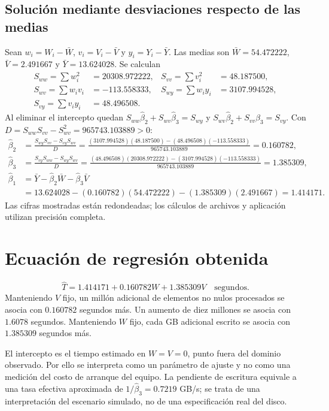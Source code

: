 \documentclass[11pt,a4paper]{article}
\begin{document}
\subsection{Solución mediante desviaciones respecto de las medias}
Sean $w_i=W_i-\bar W$, $v_i=V_i-\bar V$ y $y_i=Y_i-\bar Y$. Las medias son $\bar W=54.472222$, $\bar V=2.491667$ y $\bar Y=13.624028$. Se calculan
\begin{align*}
S_{ww}=\sum w_i^2&=20308.972222,& S_{vv}=\sum v_i^2&=48.187500,\\
S_{wv}=\sum w_iv_i&=-113.558333,& S_{wy}=\sum w_iy_i&=3107.994528,\\
S_{vy}=\sum v_iy_i&=48.496508.
\end{align*}
Al eliminar el intercepto quedan $S_{ww}\hat\beta_2+S_{wv}\hat\beta_3=S_{wy}$ y $S_{wv}\hat\beta_2+S_{vv}\hat\beta_3=S_{vy}$. Con $D=S_{ww}S_{vv}-S_{wv}^2=965743.103889>0$:
\begin{align*}
\hat\beta_2&=\frac{S_{wy}S_{vv}-S_{vy}S_{wv}}{D}
=\frac{(3107.994528)(48.187500)-(48.496508)(-113.558333)}{965743.103889}=0.160782,\\
\hat\beta_3&=\frac{S_{vy}S_{ww}-S_{wy}S_{wv}}{D}
=\frac{(48.496508)(20308.972222)-(3107.994528)(-113.558333)}{965743.103889}=1.385309,\\
\hat\beta_1&=\bar Y-\hat\beta_2\bar W-\hat\beta_3\bar V\\
&=13.624028-(0.160782)(54.472222)-(1.385309)(2.491667)=1.414171.
\end{align*}
Las cifras mostradas están redondeadas; los cálculos de archivos y aplicación utilizan precisión completa.

\section{Ecuación de regresión obtenida}
\begin{equation}\boxed{\widehat T=1.414171+0.160782W+1.385309V\quad\text{segundos}.}\end{equation}
Manteniendo $V$ fijo, un millón adicional de elementos no nulos procesados se asocia con $0.160782$ segundos más. Un aumento de diez millones se asocia con $1.6078$ segundos. Manteniendo $W$ fijo, cada GB adicional escrito se asocia con $1.385309$ segundos más.

El intercepto es el tiempo estimado en $W=V=0$, punto fuera del dominio observado. Por ello se interpreta como un parámetro de ajuste y no como una medición del costo de arranque del equipo. La pendiente de escritura equivale a una tasa efectiva aproximada de $1/\hat\beta_3=0.7219$ GB/s; se trata de una interpretación del escenario simulado, no de una especificación real del disco.
\end{document}

